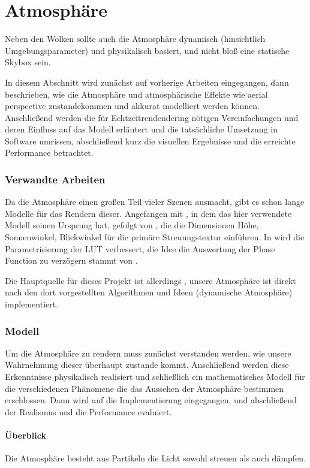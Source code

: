 \part{Atmosphäre}

Neben den Wolken sollte auch die Atmosphäre dynamisch (hinsichtlich Umgebungsparameter) und physikalisch basiert, und
nicht bloß eine statische Skybox sein.

In diesem Abschnitt wird zunächst auf vorherige Arbeiten eingegangen, dann beschrieben, wie die Atmosphäre und
atmosphärische Effekte wie aerial perspective zustandekommen und akkurat modelliert werden können. Anschließend
werden die für Echtzeitrendendering nötigen Vereinfachungen und deren Einfluss auf das Modell erläutert und
die tatsächliche Umsetzung in Software umrissen, abschließend kurz die visuellen Ergebnisse und die erreichte
Performance betrachtet.

\section{Verwandte Arbeiten}
Da die Atmosphäre einen großen Teil vieler Szenen ausmacht, gibt es schon lange Modelle für das Rendern dieser.
Angefangen mit \cite{Nishita93}, in dem das hier verwendete Modell seinen Ursprung hat, gefolgt von
\cite{Schafhitzel07}, die die Dimensionen Höhe, Sonnenwinkel, Blickwinkel für die primäre Streuungstextur einführen.
In \cite{Bruneton08} wird die Parametrisierung der LUT verbessert, die Idee die Auswertung der Phase Function zu
verzögern stammt von \cite{Elek09}.

Die Hauptquelle für dieses Projekt ist allerdings \cite{Bodare14}, unsere Atmosphäre ist direkt nach den dort
vorgestellten Algorithmen und Ideen (dynamische Atmosphäre) implementiert.

\section{Modell}

Um die Atmosphäre zu rendern muss zunächst verstanden werden, wie unsere Wahrnehmung dieser überhaupt zustande kommt.
Anschließend werden diese Erkenntnisse physikalisch realisiert und schließlich ein mathematisches Modell für die
verschiedenen Phänomene die das Aussehen der Atmosphäre bestimmen erschlossen. Dann wird auf die Implementierung
eingegangen, und abschließend der Realismus und die Performance evaluiert.

\subsection{Überblick}
Die Atmosphäre besteht aus Partikeln die Licht sowohl streuen als auch dämpfen.

